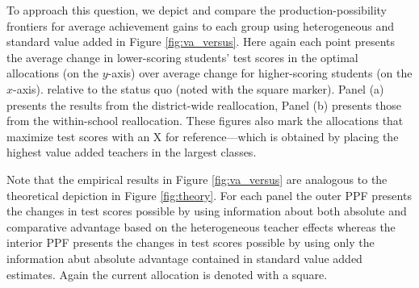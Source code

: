 \documentclass[12pt]{article}
\theoremstyle{definition}
\theoremstyle{definition}
\theoremstyle{definition}
\theoremstyle{definition}
\begin{document}
To approach this question, we depict and compare the production-possibility frontiers for average achievement gains to each group using heterogeneous and standard value added in Figure \ref{fig:va_versus}. Here again each point presents the average change in lower-scoring students' test scores in the optimal allocations (on the $y$-axis) over average change for higher-scoring students (on the $x$-axis). relative to the status quo (noted with the square marker). Panel (a) presents the results from the district-wide reallocation, Panel (b) presents those from the within-school reallocation. These figures also mark the allocations that maximize test scores with an X for reference---which is obtained by placing the highest value added teachers in the largest classes.

Note that the empirical results in Figure \ref{fig:va_versus} are analogous to the theoretical depiction in Figure \ref{fig:theory}. For each panel the outer PPF presents the changes in test scores possible by using information about both absolute and comparative advantage based on the heterogeneous teacher effects whereas the interior PPF presents the changes in test scores possible by using only the information abut absolute advantage contained in standard value added  estimates. Again the current allocation is denoted with a square.
\end{document}

